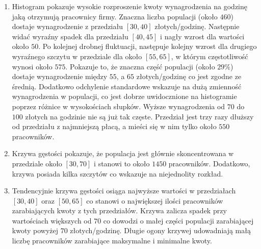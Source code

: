         \begin{enumerate}
            \item Histogram pokazuje wysokie rozproszenie kwoty wynagrodzenia na godzinę jaką otrzymują pracownicy firmy. Znaczna liczba populacji (około $460$) dostaje wynagrodzenie z przedziału $[30, 40]$ złotych/godzinę. Następnie widać wyraźny spadek dla przedziału $[40, 45]$ i nagły wzrost dla wartości około $50$. Po kolejnej drobnej fluktuacji, następuje kolejny wzrost dla drugiego wyraźnego szczytu w przedziale dla około $[55, 65]$, w którym częstotliwość wynosi około $575$. Pokazuje to, że znaczna część populacji (około $29\%$) dostaje wynagrodzenie między $55$, a $65$ złotych/godzinę co jest zgodne ze średnią. Dodatkowo odchylenie standardowe wskazuje na dużą zmienność wynagrodzenia w populacji, co jest dobrze uwidocznione na histogramie poprzez różnice w wysokościach słupków. Wyższe wynagrodzenia od $70$ do $100$ złotych na godzinie nie są już tak częste. Przedział jest trzy razy dłuższy od przedziału z najmniejszą płacą, a mieści się w nim tylko około $550$ pracowników.
            \item Krzywa gęstości pokazuje, że populacja jest głównie skoncentrowana w przedziale około $[30, 70]$ i stanowi to około $1450$ pracowników. Dodatkowo, krzywa posiada kilka szczytów co wskazuje na niejednolity rozkład. 
            \item Tendencyjnie krzywa gęstości osiąga najwyższe wartości w przedziałach $[30, 40]$ oraz $[50, 65]$ co stanowi o największej ilości pracowników zarabiających kwoty z tych przedziałów. Krzywa zalicza spadek przy wartościach większych od $70$ co dowodzi o małej części populacji zarabiającej kwoty powyżej $70$ złotych/godzinę. Długie ogony krzywej udowadniają małą liczbę pracowników zarabiające maksymalne i minimalne kwoty.
        \end{enumerate}
    
